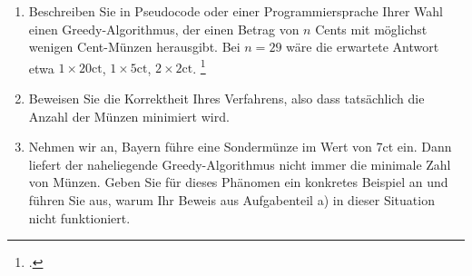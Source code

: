 \documentclass{bschlangaul-aufgabe}
\begin{document}

\begin{enumerate}


\item Beschreiben Sie in Pseudocode oder einer Programmiersprache Ihrer
Wahl einen Greedy-Algorithmus, der einen Betrag von $n$ Cents mit
möglichst wenigen Cent-Münzen herausgibt. Bei $n = 29$ wäre die
erwartete Antwort etwa $1 \times 20 \text{ct}$, $1 \times 5 \text{ct}$,
$2 \times 2 \text{ct}$.
\footcite[Thema 1 Aufgabe 1]{examen:66115:2007:03}


\item Beweisen Sie die Korrektheit Ihres Verfahrens, also dass
tatsächlich die Anzahl der Münzen minimiert wird.


\item Nehmen wir an, Bayern führe eine Sondermünze im Wert von 7ct ein.
Dann liefert der naheliegende Greedy-Algorithmus nicht immer die
minimale Zahl von Münzen. Geben Sie für dieses Phänomen ein konkretes
Beispiel an und führen Sie aus, warum Ihr Beweis aus Aufgabenteil a) in
dieser Situation nicht funktioniert.
\end{enumerate}
\end{document}
